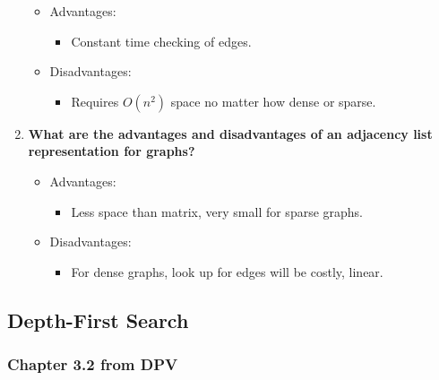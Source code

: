 \documentclass[a4paper,11pt]{article}
\begin{document}
\begin{enumerate}
  \begin{itemize}
  \itemsep1pt\parskip0pt
  \item
    Advantages:

    \begin{itemize}
    \itemsep1pt\parskip0pt
    \item
      Constant time checking of edges.
    \end{itemize}
  \item
    Disadvantages:

    \begin{itemize}
    \itemsep1pt\parskip0pt
    \item
      Requires $O(n^2)$ space no matter how dense or sparse.
    \end{itemize}
  \end{itemize}
\item
  \textbf{What are the advantages and disadvantages of an adjacency list
  representation for graphs?}

  \begin{itemize}
  \itemsep1pt\parskip0pt
  \item
    Advantages:

    \begin{itemize}
    \itemsep1pt\parskip0pt
    \item
      Less space than matrix, very small for sparse graphs.
    \end{itemize}
  \item
    Disadvantages:

    \begin{itemize}
    \itemsep1pt\parskip0pt
    \item
      For dense graphs, look up for edges will be costly, linear.
    \end{itemize}
  \end{itemize}
\end{enumerate}

\subsection{Depth-First Search}\label{depth-first-search}

\subsubsection{Chapter 3.2 from DPV}\label{chapter-3.2-from-dpv}
\end{document}

